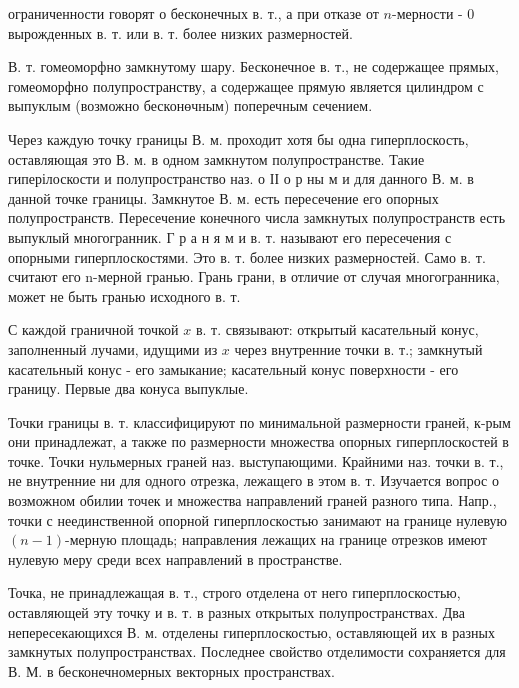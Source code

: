 \documentclass[10pt]{article}
\begin{document}
ограниченности говорят о бесконечных в. т., а при отказе от $n$-мерности - 0 вырожденных в. т. или в. т. более низких размерностей.



В. т. гомеоморфно замкнутому шару. Бесконечное в. т., не содержащее прямых, гомеоморфно полупространству, а содержащее прямую является цилиндром с выпуклым (возможно бесконөчным) поперечным сечением.



Через каждую точку границы В. м. проходит хотя бы одна гиперплоскость, оставляющая это В. м. в одном замкнутом полупространстве. Такие гиперілоскости и полупространство наз. о ІІ о р ны м и для данного В. м. в данной точке границы. Замкнутое В. м. есть пересечение его опорных полупространств. Пересечение конечного числа замкнутых полупространств есть выпуклый многогранник. Г р а н я м и в. т. называют его пересечения с опорными гиперплоскостями. Это в. т. более низких размерностей. Само в. т. считают его n-мерной гранью. Грань грани, в отличие от случая многогранника, может не быть гранью исходного в. т.



С каждой граничной точкой $x$ в. т. связывают: открытый касательный конус, заполненный лучами, идущими из $x$ через внутренние точки в. т.; замкнутый касательный конус - его замыкание; касательный конус поверхности - его границу. Первые два конуса выпуклые.



Точки границы в. т. классифицируют по минимальной размерности граней, к-рым они принадлежат, а также по размерности множества опорных гиперплоскостей в точке. Точки нульмерных граней наз. выступающими. Крайними наз. точки в. т., не внутренние ни для одного отрезка, лежащего в этом в. т. Изучается вопрос о возможном обилии точек и множества направлений граней разного типа. Напр., точки с неединственной опорной гиперплоскостью занимают на границе нулевую $(n-1)$-мерную площадь; направления лежащих на границе отрезков имеют нулевую меру среди всех направлений в пространстве.



Точка, не принадлежащая в. т., строго отделена от него гиперплоскостью, оставляющей эту точку и в. т. в разных открытых полупространствах. Два непересекающихся В. м. отделены гиперплоскостью, оставляющей их в разных замкнутых полупространствах. Последнее свойство отделимости сохраняется для В. М. в бесконечномерных векторных пространствах.
\end{document}
